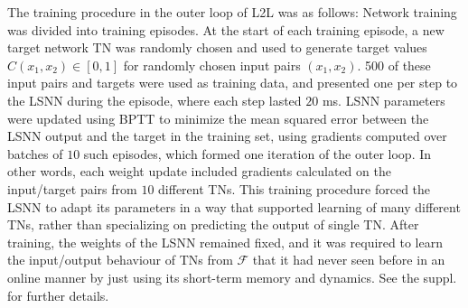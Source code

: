 \documentclass{article} \pdfoutput=1
\begin{document}
The training procedure in the outer loop of L2L was as follows: Network training was divided into training episodes.
At the start of each training episode, a new 
target network TN was randomly chosen and used to generate target values $C(x_1, x_2) \in [0, 1]$ for randomly chosen input pairs $(x_1,x_2)$.
500 of these input pairs and targets were used as training data, and presented one per step to the LSNN during the episode, 
where each step lasted $20$ ms.
LSNN parameters were updated using BPTT to minimize the mean squared error between the LSNN output and the target in the training set, using gradients computed over batches of $10$ such episodes, which formed one iteration of the outer loop.
In other words, each weight update included gradients calculated on the input/target pairs from $10$ different TNs. 
This training procedure forced the LSNN to adapt its parameters in a way that supported learning of many different TNs, rather than specializing on predicting the output of single TN.
After training, the weights of the LSNN remained fixed, and it was required to learn the input/output behaviour of TNs from $\mathcal{F}$ that it had never seen before in an online manner by just using its short-term memory and dynamics.
See the suppl. for further details.
\end{document}
